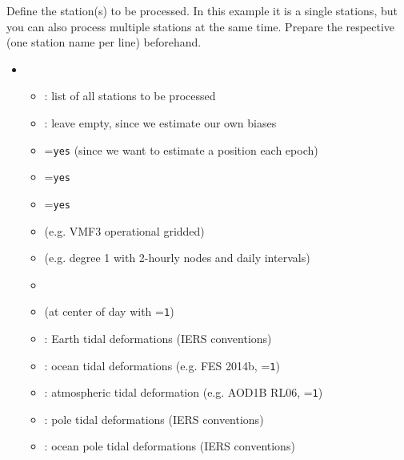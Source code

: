 Define the station(s) to be processed. In this example it is a single stations, but you can also process multiple
stations at the same time.
Prepare the respective  (one station name per line) beforehand.
\begin{itemize}
  \item {}
  \begin{itemize}
    \item {}: list of all stations to be processed
    \item {}: leave empty, since we estimate our own biases
    \item {}=\verb|yes| (since we want to estimate a position each epoch)
    \item {}=\verb|yes|
    \item {}=\verb|yes|
    \item {} (e.g. VMF3 operational gridded)
    \item {} (e.g. degree 1 with 2-hourly
          nodes and daily intervals)
    \item {}
    \item {} (at center of day with
          =\verb|1|)
    \item {}: Earth tidal deformations (IERS conventions)
    \item {}: ocean tidal deformations
          (e.g. FES 2014b, =\verb|1|)
    \item {}: atmospheric tidal deformation
          (e.g. AOD1B RL06, =\verb|1|)
    \item {}: pole tidal deformations (IERS conventions)
    \item {}: ocean pole tidal deformations (IERS conventions)

\end{itemize}
\end{itemize}
